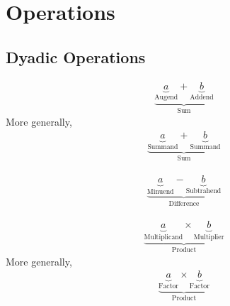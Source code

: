 \documentclass[20150903-160354-rs2.2-MarksMathNotebook.tex]{subfiles}
\begin{document}
%
%

\chapter{Operations}



\section{Dyadic Operations}


\begin{definition}
\begin{align}
\underbrace{\underbrace{a}_{\text{Augend}}+\underbrace{b}_{\text{Addend}}}_{\text{Sum}} \label{eq:ooa}
\end{align}
More generally,
\begin{align}
\underbrace{\underbrace{a}_{\text{Summand}}+\underbrace{b}_{\text{Summand}}}_{\text{Sum}} \label{eq:ooag}
\end{align}
\end{definition}

\begin{definition}
\begin{align}
\underbrace{\underbrace{a}_{\text{Minuend}}-\underbrace{b}_{\text{Subtrahend}}}_{\text{Difference}} \label{eq:oos}
\end{align}
\end{definition}

\begin{definition} 
\begin{align}
\underbrace{\underbrace{a}_{\text{Multiplicand}} \times \underbrace{b}_{\text{Multiplier}}}_{\text{Product}} \label{eq:oom}
\end{align}
More generally,
\begin{align}
\underbrace{\underbrace{a}_{\text{Factor}} \times \underbrace{b}_{\text{Factor}}}_{\text{Product}} \label{eq:oomg}
\end{align}
\end{definition}
\end{document}
